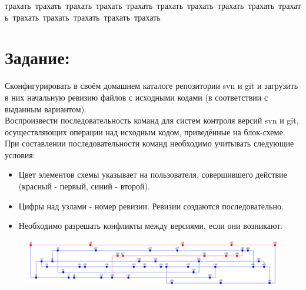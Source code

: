 \thispagestyle{empty}
\BgThispage
\begin{flushright}
    \mbox{трахать трахать трахать трахать трахать трахать трахать трахать трахать трахать трахать трахать трахать трахать трахать}
\end{flushright}
\vspace{5cm}
\tableofcontents

\newpage

\thispagestyle{empty}
\BgThispage
\section{Задание:}

Сконфигурировать в своём домашнем каталоге репозитории svn и git и загрузить в них начальную ревизию файлов с исходными кодами
(в соответствии с выданным вариантом).\\
Воспроизвести последовательность команд для систем контроля версий svn и git, осуществляющих операции над исходным кодом, приведённые на блок-схеме.\\
При составлении последовательности команд необходимо учитывать следующие условия:

\begin{itemize}
    \item Цвет элементов схемы указывает на пользователя, совершившего действие (красный - первый, синий - второй).
    \item Цифры над узлами - номер ревизии. Ревизии создаются последовательно.
    \item Необходимо разрешать конфликты между версиями, если они возникают.
\end{itemize}

\begin{figure}[H]
    \centering
    \includegraphics[scale=1.3]{img/scheme}
\end{figure}

